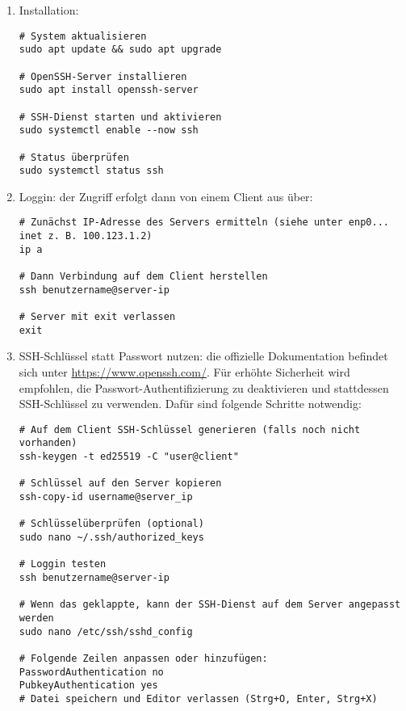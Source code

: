 \documentclass[12pt,a4paper]{report}
\begin{document}
  \begin{enumerate}
    \item Installation:
    
    \begin{verbatim}
# System aktualisieren
sudo apt update && sudo apt upgrade

# OpenSSH-Server installieren
sudo apt install openssh-server

# SSH-Dienst starten und aktivieren
sudo systemctl enable --now ssh

# Status überprüfen
sudo systemctl status ssh
    \end{verbatim}  

    \item Loggin:
    der Zugriff erfolgt dann von einem Client aus über:  
    
    \begin{verbatim}
# Zunächst IP-Adresse des Servers ermitteln (siehe unter enp0... inet z. B. 100.123.1.2)
ip a

# Dann Verbindung auf dem Client herstellen
ssh benutzername@server-ip

# Server mit exit verlassen
exit
    \end{verbatim}  

    \item SSH-Schlüssel statt Passwort nutzen:
    die offizielle Dokumentation befindet sich unter \url{https://www.openssh.com/}.  
    Für erhöhte Sicherheit wird empfohlen, die Passwort-Authentifizierung zu deaktivieren und stattdessen SSH-Schlüssel zu verwenden.
    Dafür sind folgende Schritte notwendig:
  
    \begin{verbatim}
# Auf dem Client SSH-Schlüssel generieren (falls noch nicht vorhanden)
ssh-keygen -t ed25519 -C "user@client"

# Schlüssel auf den Server kopieren
ssh-copy-id username@server_ip

# Schlüsselüberprüfen (optional)
sudo nano ~/.ssh/authorized_keys

# Loggin testen
ssh benutzername@server-ip

# Wenn das geklappte, kann der SSH-Dienst auf dem Server angepasst werden
sudo nano /etc/ssh/sshd_config

# Folgende Zeilen anpassen oder hinzufügen:
PasswordAuthentication no
PubkeyAuthentication yes
# Datei speichern und Editor verlassen (Strg+O, Enter, Strg+X)


\end{verbatim}
\end{enumerate}
\end{document}
